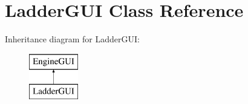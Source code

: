 \hypertarget{class_ladder_g_u_i}{\section{Ladder\-G\-U\-I Class Reference}
\label{class_ladder_g_u_i}
}
Inheritance diagram for Ladder\-G\-U\-I\-:\begin{figure}[H]
\begin{center}
\leavevmode
\includegraphics[height=2.000000cm]{class_ladder_g_u_i}
\end{center}
\end{figure}
